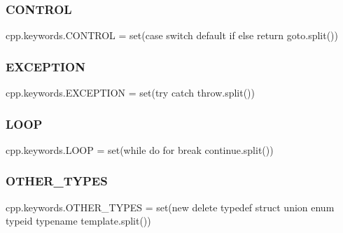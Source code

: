 \mbox{\label{namespacecpp_1_1keywords_a374dfe9c96681079802ba4724287b8ff}} 
\subsubsection{\texorpdfstring{CONTROL}{CONTROL}}
{\footnotesize\ttfamily cpp.\+keywords.\+C\+O\+N\+T\+R\+OL = set(\textquotesingle{}case switch default if else return goto\textquotesingle{}.split())}

\mbox{\label{namespacecpp_1_1keywords_a2665fb8a25a4dae03fa5d3dc975c537c}} 
\subsubsection{\texorpdfstring{EXCEPTION}{EXCEPTION}}
{\footnotesize\ttfamily cpp.\+keywords.\+E\+X\+C\+E\+P\+T\+I\+ON = set(\textquotesingle{}try catch throw\textquotesingle{}.split())}

\mbox{\label{namespacecpp_1_1keywords_af0164c05398a2291487b76414102d555}} 
\subsubsection{\texorpdfstring{LOOP}{LOOP}}
{\footnotesize\ttfamily cpp.\+keywords.\+L\+O\+OP = set(\textquotesingle{}while do for break continue\textquotesingle{}.split())}

\mbox{\label{namespacecpp_1_1keywords_aa86a5e35a3ace14022a5ca1b91baf207}} 
\subsubsection{\texorpdfstring{OTHER\_TYPES}{OTHER\_TYPES}}
{\footnotesize\ttfamily cpp.\+keywords.\+O\+T\+H\+E\+R\+\_\+\+T\+Y\+P\+ES = set(\textquotesingle{}new delete typedef struct union enum typeid typename template\textquotesingle{}.split())}

